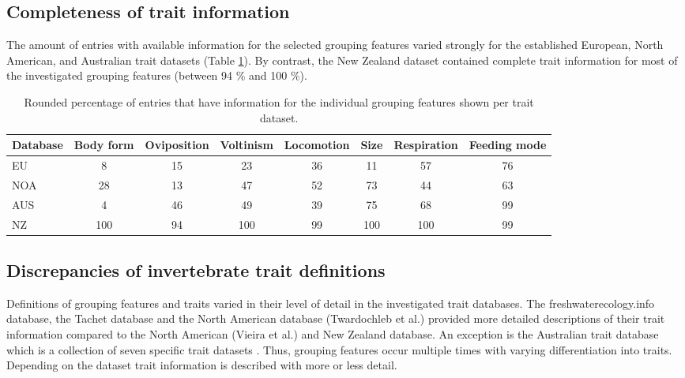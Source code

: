 \documentclass{article}
\begin{document}

\subsection*{Completeness of trait information}

The amount of entries with available information for the selected grouping features varied strongly for the established European, North American, and Australian trait datasets (Table \ref{tab:trait_coverage}). By contrast, the New Zealand dataset contained complete trait information for most of the investigated grouping features (between 94 \% and 100 \%).

\begin{table}[ht]
    \centering
    \caption{Rounded percentage of entries that have 
    information for the individual grouping features
    shown per trait dataset.} 
    \label{tab:trait_coverage}
    \begin{tabular}{lccccccc}
    \toprule[.1em]
    Database & Body form & Oviposition & Voltinism & Locomotion & Size & Respiration & Feeding mode \\ 
    \toprule[.1em]
    EU & 8 & 15 & 23 & 36 & 11 & 57 & 76 \\ 
    NOA & 28 & 13 & 47 & 52 & 73 & 44 & 63 \\ 
    AUS & 4 & 46 & 49 & 39 & 75 & 68 & 99 \\ 
    NZ & 100 & 94 & 100 & 99 & 100 & 100 & 99 \\ 
    \bottomrule
    \end{tabular}
\end{table}

\newpage


\subsection*{Discrepancies of invertebrate trait definitions}

Definitions of grouping features and traits varied in their level of detail in the investigated trait databases. The freshwaterecology.info database, the Tachet database and the North American database (Twardochleb et al.) provided more detailed descriptions of their trait information compared to the North American (Vieira et al.) and New Zealand database. An exception is the Australian trait database which is a collection of seven specific trait datasets \cite{kefford_integrated_2020}. Thus, grouping features occur multiple times with varying differentiation into traits. Depending on the dataset trait information is described with more or less detail.
\end{document}
